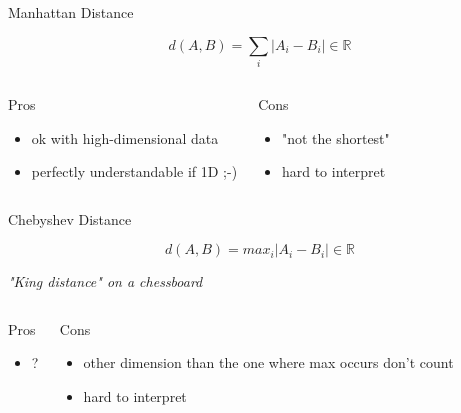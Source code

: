 \documentclass{beamer}
\begin{document}
\begin{frame}{Manhattan Distance}

$$d(A,B)= \sum_{i}|A_i-B_i| \in \mathbb{R}$$



\begin{scriptsize}
\begin{columns}[T,onlytextwidth]
\begin{block}{Pros}
\begin{itemize}
  \item ok with high-dimensional data
  \item perfectly understandable if 1D ;-)
\end{itemize}
\end{block}
\begin{block}{Cons}
\begin{spacing}{0.9}
\begin{itemize}
  \item "not the shortest"
  \item hard to interpret
\end{itemize}
\end{spacing}
\end{block}
\end{columns}
\end{scriptsize}




\end{frame}



\begin{frame}{Chebyshev Distance}

$$d(A,B)= max_i |A_i-B_i| \in \mathbb{R}$$


\textit{"King distance"  on a chessboard}

\begin{scriptsize}
\begin{columns}[T,onlytextwidth]
\begin{block}{Pros}
\begin{itemize}
  \item ? 
\end{itemize}
\end{block}
\begin{block}{Cons}
\begin{spacing}{0.9}
\begin{itemize}
  \item  other dimension than the one where max occurs don't count 
  \item hard to interpret
\end{itemize}
\end{spacing}
\end{block}
\end{columns}
\end{scriptsize}




\end{frame}
\end{document}
